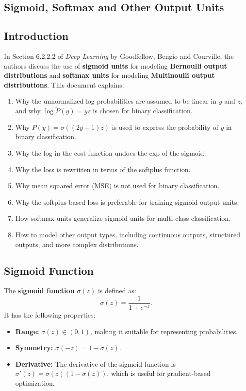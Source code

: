 \begin{notechapter}
\chapter{Sigmoid, Softmax and Other Output Units}\label{ch:output-units}

\section{Introduction}
In Section 6.2.2.2 of \textit{Deep Learning} by Goodfellow, Bengio and Courville, the authors discuss
the use of \textbf{sigmoid units} for modeling \textbf{Bernoulli output
distributions} and \textbf{softmax units} for modeling \textbf{Multinoulli
output distributions}. This document explains:
\begin{enumerate}
    \item Why the unnormalized log probabilities are assumed to be linear
          in \( y \) and \( z \), and why \( \log \tilde{P}(y) = yz \)
          is chosen for binary classification.
    \item Why \( P(y) = \sigma((2y - 1)z) \) is used to express the
          probability of \( y \) in binary classification.
    \item Why the log in the cost function undoes the exp of the sigmoid.
    \item Why the loss is rewritten in terms of the softplus function.
    \item Why mean squared error (MSE) is not used for binary
          classification.
    \item Why the softplus-based loss is preferable for training sigmoid
          output units.
    \item How softmax units generalize sigmoid units for multi-class
          classification.
    \item How to model other output types, including continuous outputs,
          structured outputs, and more complex distributions.
\end{enumerate}

\section{Sigmoid Function}
The \textbf{sigmoid function} \( \sigma(z) \) is defined as:
\[
\sigma(z) = \frac{1}{1 + e^{-z}}.
\]
It has the following properties:
\begin{itemize}
    \item \textbf{Range:} \( \sigma(z) \in (0, 1) \), making it suitable
          for representing probabilities.
    \item \textbf{Symmetry:} \( \sigma(-z) = 1 - \sigma(z) \).
    \item \textbf{Derivative:} The derivative of the sigmoid function is
          \( \sigma'(z) = \sigma(z)(1 - \sigma(z)) \), which is useful
          for gradient-based optimization.
\end{itemize}


\end{notechapter}
